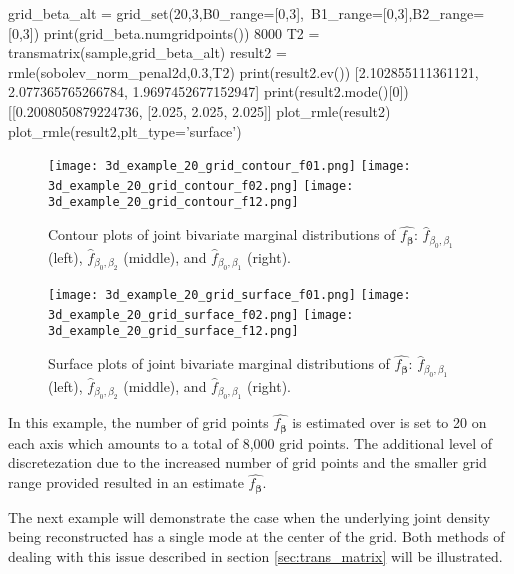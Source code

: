\documentclass[a4paper,12pt]{article}
\newcommand{\bbeta}{{\boldsymbol{\beta}}}
\begin{document}
\medskip

\begin{python}
grid_beta_alt = grid_set(20,3,B0_range=[0,3],\ 
B1_range=[0,3],B2_range=[0,3])
print(grid_beta.numgridpoints())
8000
T2 = transmatrix(sample,grid_beta_alt)
result2 = rmle(sobolev_norm_penal2d,0.3,T2)
print(result2.ev())
[2.102855111361121, 2.077365765266784, 1.9697452677152947]
print(result2.mode()[0])
[[0.2008050879224736, [2.025, 2.025, 2.025]]
plot_rmle(result2)
plot_rmle(result2,plt_type='surface')
\end{python}

\begin{figure}[htp]
	
	\centering
	\texttt{[image: 3d\_example\_20\_grid\_contour\_f01.png]}\hfill
	\texttt{[image: 3d\_example\_20\_grid\_contour\_f02.png]}\hfill
	\texttt{[image: 3d\_example\_20\_grid\_contour\_f12.png]}
	
	\caption{Contour plots of joint bivariate marginal distributions of $\hat{f_\bbeta}$: $\hat{f}_{\beta_0,\beta_1}$ (left), $\hat{f}_{\beta_0,\beta_2}$ (middle), and $\hat{f}_{\beta_0,\beta_1}$ (right).}
	\label{fig:3d_20_grid_cont}
	
\end{figure}

\begin{figure}[htp]
	
	\centering
	\texttt{[image: 3d\_example\_20\_grid\_surface\_f01.png]}\hfill
	\texttt{[image: 3d\_example\_20\_grid\_surface\_f02.png]}\hfill
	\texttt{[image: 3d\_example\_20\_grid\_surface\_f12.png]}
	
	\caption{Surface plots of joint bivariate marginal distributions of $\hat{f_\bbeta}$: $\hat{f}_{\beta_0,\beta_1}$ (left), $\hat{f}_{\beta_0,\beta_2}$ (middle), and $\hat{f}_{\beta_0,\beta_1}$ (right).}
	\label{fig:3d_20_grid_surface}
	
\end{figure}

In this example, the number of grid points $\hat{f_\bbeta}$ is estimated over is set to 20 on each axis which amounts to a total of 8,000 grid points. The additional level of discretezation due to the increased number of grid points and the smaller grid range provided resulted in an estimate $\hat{f_\bbeta}$.

The next example will demonstrate the case when the underlying joint density being reconstructed has a single mode at the center of the grid. Both methods of dealing with this issue described in section \ref{sec:trans_matrix} will be illustrated.
\end{document}
